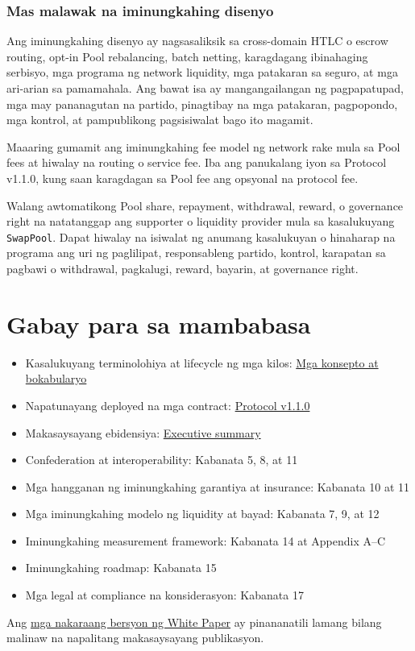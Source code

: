 \documentclass[11pt]{article}
\begin{document}
\subsubsection*{Mas malawak na iminungkahing disenyo}

Ang iminungkahing disenyo ay nagsasaliksik sa cross-domain HTLC o escrow routing, opt-in Pool rebalancing, batch netting, karagdagang ibinahaging serbisyo, mga programa ng network liquidity, mga patakaran sa seguro, at mga ari-arian sa pamamahala. Ang bawat isa ay mangangailangan ng pagpapatupad, mga may pananagutan na partido, pinagtibay na mga patakaran, pagpopondo, mga kontrol, at pampublikong pagsisiwalat bago ito magamit.

Maaaring gumamit ang iminungkahing fee model ng network rake mula sa Pool fees at hiwalay na routing o service fee. Iba ang panukalang iyon sa Protocol v1.1.0, kung saan karagdagan sa Pool fee ang opsyonal na protocol fee.

Walang awtomatikong Pool share, repayment, withdrawal, reward, o governance right na natatanggap ang supporter o liquidity provider mula sa kasalukuyang \texttt{SwapPool}. Dapat hiwalay na isiwalat ng anumang kasalukuyan o hinaharap na programa ang uri ng paglilipat, responsableng partido, kontrol, karapatan sa pagbawi o withdrawal, pagkalugi, reward, bayarin, at governance right.

\section*{Gabay para sa mambabasa}

\begin{itemize}[leftmargin=*]
\item Kasalukuyang terminolohiya at lifecycle ng mga kilos: \href{https://docs.cosmolocal.credit/fil/introduction/concepts}{Mga konsepto at bokabularyo}
\item Napatunayang deployed na mga contract: \href{https://docs.cosmolocal.credit/fil/protocol/overview}{Protocol v1.1.0}
\item Makasaysayang ebidensiya: \href{https://docs.cosmolocal.credit/fil/white-paper/executive-summary}{Executive summary}
\item Confederation at interoperability: Kabanata 5, 8, at 11
\item Mga hangganan ng iminungkahing garantiya at insurance: Kabanata 10 at 11
\item Mga iminungkahing modelo ng liquidity at bayad: Kabanata 7, 9, at 12
\item Iminungkahing measurement framework: Kabanata 14 at Appendix A--C
\item Iminungkahing roadmap: Kabanata 15
\item Mga legal at compliance na konsiderasyon: Kabanata 17
\end{itemize}
Ang \href{https://docs.cosmolocal.credit/fil/white-paper/archive}{mga nakaraang bersyon ng White Paper} ay pinananatili lamang bilang malinaw na napalitang makasaysayang publikasyon.
\end{document}
